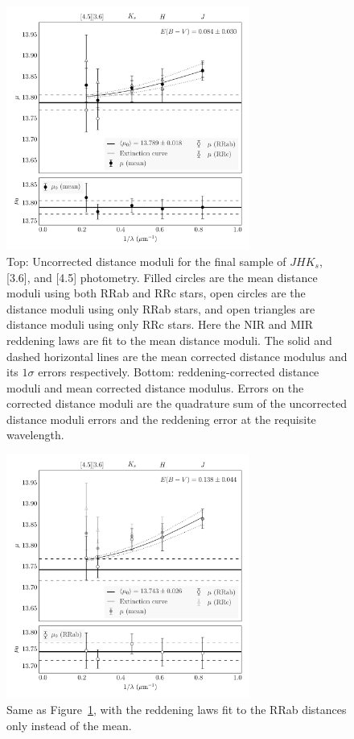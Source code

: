\documentclass[a4paper,fleqn,usenatbib]{mnras}
\begin{document}
\begin{figure}
\begin{center}
\includegraphics[width=80mm, trim=0.75cm 0 0.5cm 0]{reworked_fitting_code/final_plots/multiwavelength_distance_m4_clipped_mean.pdf}
\caption{Top: Uncorrected distance moduli for the final sample of $J\!H\!K_s$, [3.6], and [4.5] photometry. Filled circles are the mean distance moduli using both RRab and RRc stars, open circles are the distance moduli using only RRab stars, and open triangles are distance moduli using only RRc stars. Here the NIR and MIR reddening laws are fit to the mean distance moduli. The solid and dashed horizontal lines are the mean corrected distance modulus and its $1\sigma$ errors respectively. Bottom: reddening-corrected distance moduli and mean corrected distance modulus. Errors on the corrected distance moduli are the quadrature sum of the uncorrected distance moduli errors and the reddening error at the requisite wavelength.}
\label{fig:omegaCen_dist_m4_mean}
\end{center}
\end{figure}

\begin{figure}
\begin{center}
\includegraphics[width=80mm, trim=0.75cm 0 0.5cm 0]{reworked_fitting_code/final_plots/multiwavelength_distance_m4_clipped_ab.pdf}
\caption{Same as Figure~\ref{fig:omegaCen_dist_m4_mean}, with the reddening laws fit to the RRab distances only instead of the mean.}
\label{fig:omegaCen_dist_m4_ab}
\end{center}
\end{figure}
\end{document}
